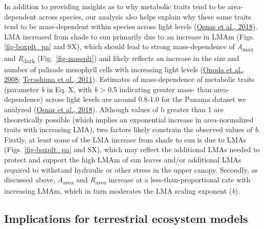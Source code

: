 \documentclass[
  12pt,
  a4paper,
,tablecaptionabove
]{scrartcl}
\begin{document}
In addition to providing insights as to why metabolic traits tend to be
area-dependent across species, our analysis also helps explain why these
same traits tend to be mass-dependent within species across light levels
(\protect\hyperlink{ref-Osnas2018}{Osnas et al., 2018}). LMA increased
from shade to sun primarily due to an increase in LMAm (Figs.
\ref{fig-boxplt_pa} and SX), which should lead to strong mass-dependence
of \emph{A}\textsubscript{max} and \emph{R}\textsubscript{dark}
(Fig.~\ref{fig-massplt}) and likely reflects an increase in the size and
number of palisade mesophyll cells with increasing light levels
(\protect\hyperlink{ref-Onoda2008}{Onoda et al., 2008};
\protect\hyperlink{ref-Terashima2011}{Terashima et al., 2011}).
Estimates of mass-dependence of metabolic traits (parameter \emph{b} in
Eq. X, with \emph{b} \textgreater{} 0.5 indicating greater mass- than
area-dependence) across light levels are around 0.8-1.0 for the Panama
dataset we analyzed (\protect\hyperlink{ref-Osnas2018}{Osnas et al.,
2018}). Although values of b greater than 1 are theoretically possible
(which implies an exponential increase in area-normalized traits with
increasing LMA), two factors likely constrain the observed values of
\emph{b}. Firstly, at least some of the LMA increase from shade to sun
is due to LMAs (Figs. \ref{fig-boxplt_pa} and SX), which may reflect the
additional LMAs needed to protect and support the high LMAm of sun
leaves and/or additional LMAs required to withstand hydraulic or other
stress in the upper canopy. Secondly, as discussed above,
\emph{A}\textsubscript{area} and \emph{R}\textsubscript{area} increase
at a less-than-proportional rate with increasing LMAm, which in turn
moderates the LMA scaling exponent (\emph{b}).

\hypertarget{implications-for-terrestrial-ecosystem-models}{%
\subsection{Implications for terrestrial ecosystem
models}\label{implications-for-terrestrial-ecosystem-models}}
\end{document}

